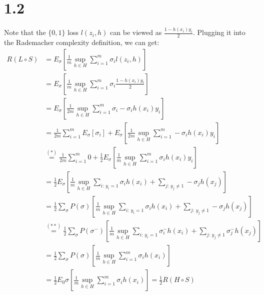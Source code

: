 \documentclass{article}
\begin{document}
\section*{1.2}
Note that the $\{0,1\}$ loss $l(z_i, h)$ can be viewed as $\frac{1-h(x_i)y_i}{2}$. Plugging it into the Rademacher complexity definition, we can get:
\begin{align*}
    R(L\circ S) &= E_\sigma \left[ \frac{1}{m}\sup_{h \in H}\sum_{i=1}^m \sigma_i l(z_i, h) \right] \\ &= E_\sigma \left[ \frac{1}{m}\sup_{h \in H}\sum_{i=1}^m \sigma_i \frac{1-h(x_i)y_i}{2} \right] \\ &= E_\sigma \left[ \frac{1}{2m}\sup_{h \in H}\sum_{i=1}^m \sigma_i - \sigma_i h(x_i)y_i \right] \\ 
    &= \frac{1}{2m}\sum_{i=1}^mE_\sigma\left[\sigma_i\right] + E_\sigma\left[\frac{1}{2m}\sup_{h\in H}\sum_{i=1}^m -\sigma_i h(x_i)y_i\right] \\
    &\stackrel{(*)}{=} \frac{1}{2m}\sum_{i=1}^m 0 + \frac{1}{2}E_\sigma\left[\frac{1}{m}\sup_{h\in H}\sum_{i=1}^m \sigma_i h(x_i)y_i\right] \\
    &= \frac{1}{2}E_\sigma\left[\frac{1}{m}\sup_{h\in H}\sum_{i: \, y_i=1} \sigma_i h(x_i) + \sum_{j: \, y_j\neq1} -\sigma_j h(x_j)\right] \\ 
    &= \frac{1}{2}\sum_{\sigma} P(\sigma)\left[ \frac{1}{m}\sup_{h\in H}\sum_{i: \, y_i=1} \sigma_i h(x_i) + \sum_{j: \, y_j\neq1} -\sigma_j h(x_j) \right] \\
    &\stackrel{(**)}{=} \frac{1}{2}\sum_{\sigma} P(\sigma^-)\left[ \frac{1}{m}\sup_{h\in H}\sum_{i: \, y_i=1} \sigma^-_i h(x_i) + \sum_{j: \, y_j\neq1} \sigma^-_j h(x_j) \right] \\
    &= \frac{1}{2}\sum_{\sigma} P(\sigma)\left[\frac{1}{m}\sup_{h\in H}\sum_{i=1}^m \sigma_i h(x_i)\right] \\
    &= \frac{1}{2}E_0\sigma\left[\frac{1}{m}\sup_{h\in H}\sum_{i=1}^m \sigma_i h(x_i)\right] = \frac{1}{2}R(H \circ S)
\end{align*}
\end{document}
